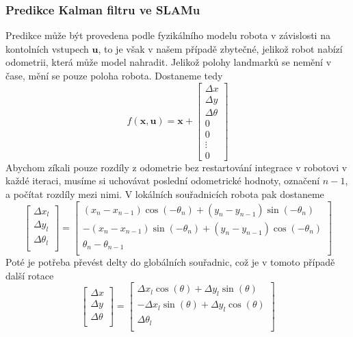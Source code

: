 \documentclass[a4paper,12pt]{article}
\begin{document}
\subsubsection{Predikce Kalman filtru ve SLAMu}
Predikce může být provedena podle fyzikálního modelu robota v závislosti na kontolních vstupech $\mathbf u$, to je však v našem případě zbytečné,
jelikož robot nabízí odometrii, která může model nahradit. Jelikož polohy landmarků se nemění v čase, mění se pouze poloha robota. Dostaneme tedy
\begin{equation}
    f(\mathbf x,\mathbf u) = \mathbf x + \begin{bmatrix}
                                    \Delta x \\
                                    \Delta y \\
                                    \Delta \theta \\
                                    0 \\
                                    0 \\
                                    \vdots \\
                                    0
                                \end{bmatrix}
\end{equation}
Abychom zíkali pouze rozdíly z odometrie bez restartování integrace v robotovi v každé iteraci, musíme si uchovávat poslední odometrické hodnoty, označení $n-1$, a počítat rozdíly mezi nimi.
V lokálních souřadnicích robota pak dostaneme 
\begin{equation}
    \begin{bmatrix}
        \Delta x_l \\
        \Delta y_l \\
        \Delta \theta_l \\
    \end{bmatrix} = 
    \begin{bmatrix}
        (x_{n} - x_{n-1})\cos(-\theta_{n}) + (y_{n} - y_{n-1})\sin(-\theta_{n}) \\
         -(x_{n} - x_{n-1})\sin(-\theta_{n}) + (y_{n} - y_{n-1})\cos(-\theta_{n})\\
        \theta_{n} - \theta_{n-1} \\
    \end{bmatrix}
\end{equation}
Poté je potřeba převést delty do globálních souřadnic, což je v tomoto případě další rotace
\begin{equation}
    \begin{bmatrix}
        \Delta x \\
        \Delta y \\
        \Delta \theta \\
    \end{bmatrix} = 
    \begin{bmatrix}
        \Delta x_l \cos(\theta) + \Delta y_l \sin(\theta) \\
         -\Delta x_l \sin(\theta) + \Delta y_l \cos(\theta)\\
         \Delta \theta_l \\
    \end{bmatrix}
\end{equation}
\end{document}
